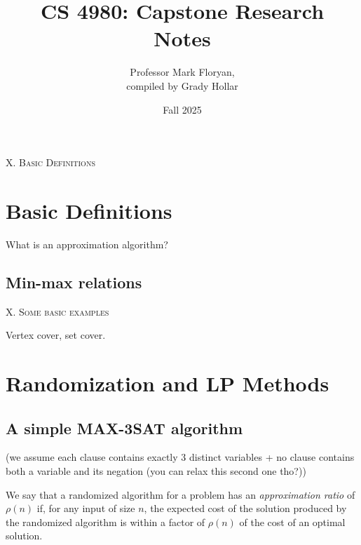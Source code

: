 \documentclass{article}
\title{CS 4980: Capstone Research\\
        Notes}
\author{Professor Mark Floryan,\\
        compiled by Grady Hollar}
\date{Fall 2025}
\newenvironment{definition}[2][Definition]{\begin{trivlist}
\item[\hskip \labelsep {\bfseries #1}\hskip \labelsep {\bfseries #2.}]}{\end{trivlist}}
\begin{document}
\setlength{\abovedisplayskip}{4pt}
\setlength{\belowdisplayskip}{4pt}
\maketitle



\begin{center}
    \textsc{X. Basic Definitions}
\end{center}

\section{Basic Definitions}

What is an approximation algorithm?

\subsection{Min-max relations}


\begin{center}
    \textsc{X. Some basic examples}
\end{center}

Vertex cover, set cover.





\section{Randomization and LP Methods}

\subsection{A simple MAX-3SAT algorithm}

(we assume each clause contains exactly 3 distinct variables + no clause contains both a variable and its negation (you can relax this second one tho?))

\begin{definition}{(Randomized Approximation Algorithm)}{}
    We say that a randomized algorithm for a problem has an \textit{approximation ratio} of $\rho(n)$ if, for any input of size $n$, the expected cost of the solution produced by the randomized algorithm is within a factor of $\rho(n)$ of the cost of an optimal solution.
\end{definition}
\end{document}

